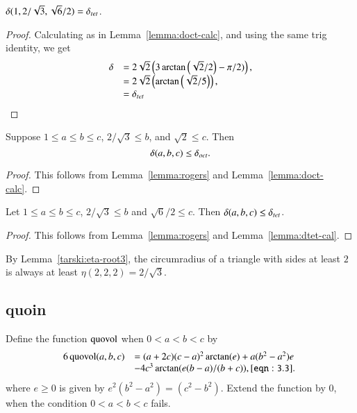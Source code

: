 \begin{lemma}
  $\delta(1,2/\sqrt3,\sqrt6/2)=\delta_{tet}$.
\end{lemma}

\begin{proof} Calculating as in Lemma~\ref{lemma:doct-calc}, and using
the same trig identity, we get
$$\begin{array}{lll}
  \delta &=
2\sqrt{2} \left(3\arctan\left(\sqrt2/2\right) - \pi/2)\right),\\
  &=2\sqrt{2}\left(\arctan\left(\sqrt2/5\right)\right),\\
  &=\delta_{tet}
\end{array}
$$
\end{proof}

\begin{lemma}
Suppose $1\le a\le  b\le c$,  $2/\sqrt{3}\le b$, and $\sqrt2\le c$.  Then
$$
\delta(a,b,c) \le \delta_{oct}.
$$
\end{lemma}

\begin{proof} This follows from Lemma~\ref{lemma:rogers} and
Lemma~\ref{lemma:doct-calc}.
\end{proof}

\begin{lemma}
Let $1\le a \le b \le c$, $2/\sqrt{3}\le b$ and $\sqrt6/2\le c$.
Then $\delta(a,b,c) \le  \delta_{tet}$.
\end{lemma}

\begin{proof}  This follows from Lemma~\ref{lemma:rogers} and
Lemma~\ref{lemma:dtet-cal}.
\end{proof}

By Lemma~\ref{tarski:eta-root3}, the circumradius of a triangle
with sides at least $2$ is always at least $\eta(2,2,2)=2/\sqrt3$.



\subsection{quoin}

Define the function ${\operatorname{quovol}}$ when $0<a<b<c$ by
    \begin{equation}
    \begin{array}{lll}
    6\,\op{quovol}(a,b,c) &= (a+2c)  %
    (c-a)^2\arctan(e)
        +a(b^2-a^2)e\\&-4c^3\arctan(e(b-a)/(b+c)),
    \tlabel{eqn:3.3}
    \end{array}
    \end{equation}
where $e\ge0$ is given by $e^2(b^2-a^2)=(c^2-b^2)$.
Extend the function by $0$, when the condition $0<a<b<c$ fails.


